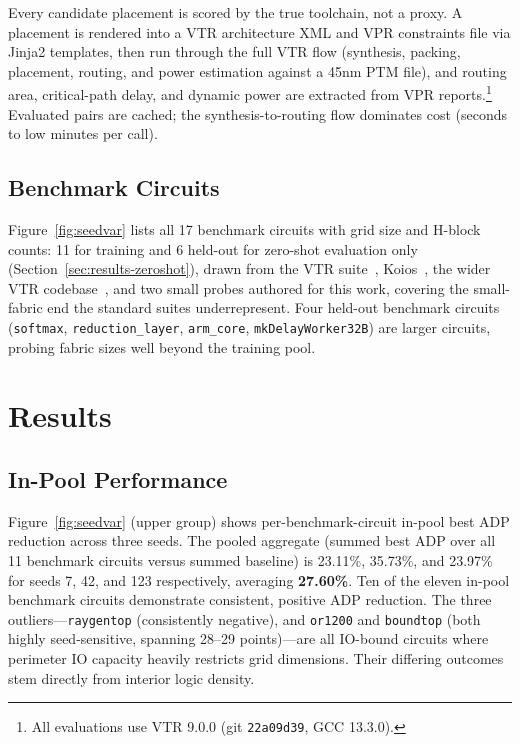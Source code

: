 \documentclass[sigconf]{acmart}
\begin{document}
Every candidate placement is scored by the true toolchain, not a proxy.
A placement is rendered into a VTR architecture XML and VPR constraints
file via Jinja2 templates, then run through the full VTR flow (synthesis,
packing, placement, routing, and power estimation against a 45nm PTM file),
and routing area, critical-path delay, and dynamic power are extracted
from VPR reports.\footnote{All evaluations use VTR 9.0.0 (git
\texttt{22a09d39}, GCC 13.3.0).} Evaluated pairs are cached; the
synthesis-to-routing flow dominates cost (seconds to low minutes per call).

\subsection{Benchmark Circuits}
\label{sec:benchmarks}

Figure~\ref{fig:seedvar} lists all 17 benchmark circuits with grid size and
H-block counts: 11 for training and 6 held-out for zero-shot evaluation
only (Section~\ref{sec:results-zeroshot}), drawn from the VTR suite~\cite{vtr8},
Koios~\cite{koios}, the wider VTR codebase~\cite{vtr9}, and two small probes authored for this work, covering the
small-fabric end the standard suites underrepresent. Four held-out
benchmark circuits (\texttt{softmax}, \texttt{reduction\_layer}, \texttt{arm\_core},
\texttt{mkDelayWorker32B}) are larger circuits, probing fabric sizes well
beyond the training pool.



\section{Results}
\label{sec:results}

\subsection{In-Pool Performance}
\label{sec:results-inpool}

Figure~\ref{fig:seedvar} (upper group) shows per-benchmark-circuit in-pool best ADP
reduction across three seeds. The pooled aggregate (summed best ADP over all 11
benchmark circuits versus summed baseline) is 23.11\%, 35.73\%, and 23.97\% for
seeds 7, 42, and 123 respectively, averaging \textbf{27.60\%}. Ten of the eleven in-pool benchmark circuits demonstrate consistent, positive ADP reduction. The three outliers---\texttt{raygentop} (consistently negative), and \texttt{or1200} and \texttt{boundtop} (both highly seed-sensitive, spanning 28--29 points)---are all IO-bound circuits where perimeter IO capacity heavily restricts grid dimensions. Their differing outcomes stem directly from interior logic density.
\end{document}
